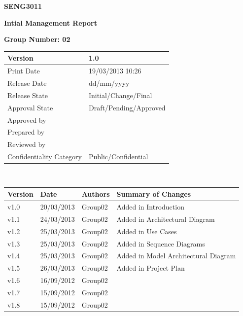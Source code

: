 \documentclass[a4paper]{article}
\begin{document}
\thispagestyle{empty}
\begin {center}
\Large\textbf{SENG3011} 

\Large\textbf{Intial Management Report}

\bigskip\Large\textbf{Group Number: 02}

\end{center}

\vspace*{16.5cm}
\begin{tabular}{|l|l|}
  \hline
  Version         & 1.0\\\hline
  Print Date      & 19/03/2013 10:26\\\hline
  Release Date    & dd/mm/yyyy\\\hline
  Release State   & Initial/Change/Final\\\hline
  Approval State  & Draft/Pending/Approved\\\hline
  Approved by     & \\\hline
  Prepared by     & \\\hline
  Reviewed by     & \\\hline
  Confidentiality Category  & Public/Confidential\\\hline
\end{tabular}
\pagebreak



\thispagestyle{plain}     %
\setcounter{page}{1}      %
\renewcommand{\thepage}{\roman{page}}  %

\\[2ex]
\begin{tabular}{|l|l|l|l|}
  \hline
  Version & Date & Authors & Summary of Changes\\\hline\hline
	v1.0 & 20/03/2013 & Group02 & Added in Introduction           	\\\hline
	v1.1 & 24/03/2013 & Group02 & Added in Architectural Diagram 		\\\hline
	v1.2 & 25/03/2013 & Group02 & Added in Use Cases  		\\\hline
	v1.3 & 25/03/2013 & Group02 & Added in Sequence Diagrams		\\\hline
	v1.4 & 25/03/2013 & Group02 & Added in Model Architectural Diagram 		\\\hline
	v1.5 & 26/03/2013 & Group02 & Added in Project Plan		\\\hline
	v1.6 & 16/09/2012 & Group02 &  		\\\hline
	v1.7 & 15/09/2012 & Group02 &  		\\\hline
	v1.8 & 15/09/2012 & Group02 &   		\\\hline
\end{tabular}
\end{document}
